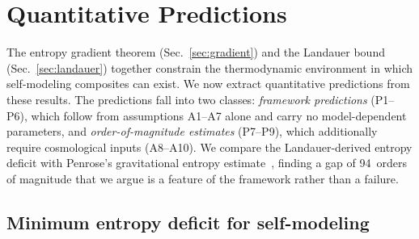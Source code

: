 
\section{Quantitative Predictions}\label{sec:predictions}

The entropy gradient theorem (Sec.~\ref{sec:gradient}) and the
Landauer bound (Sec.~\ref{sec:landauer}) together constrain the
thermodynamic environment in which self-modeling composites can exist.
We now extract quantitative predictions from these results.  The
predictions fall into two classes: \emph{framework predictions}
(P1--P6), which follow from assumptions A1--A7 alone and carry no
model-dependent parameters, and \emph{order-of-magnitude estimates}
(P7--P9), which additionally require cosmological inputs (A8--A10).
We compare the Landauer-derived entropy deficit with Penrose's
gravitational entropy estimate~\cite{Penrose1979}, finding a gap of
94~orders of magnitude that we argue is a feature of the framework
rather than a failure.

\subsection{Minimum entropy deficit for self-modeling}
\label{sec:min-entropy}

